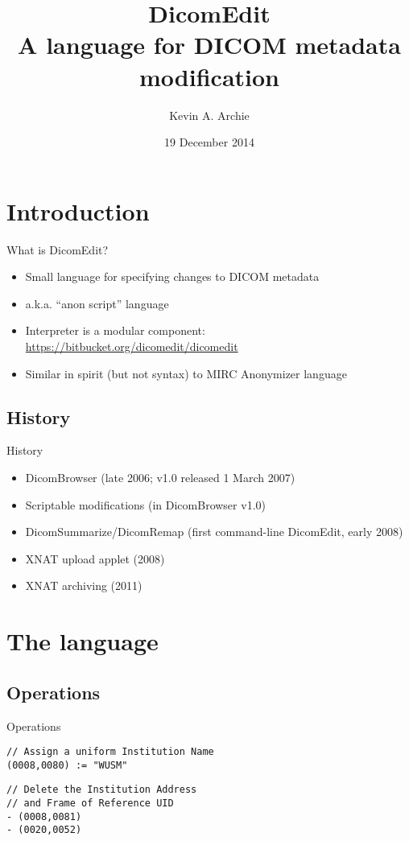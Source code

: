 \documentclass{beamer}  %
\title[DicomEdit]{DicomEdit\\A language for DICOM metadata modification}
\author{Kevin A. Archie}
\institute{Washington University Neuroinformatics Research Group}
\date{19 December 2014}
\begin{document}

\begin{frame}
\titlepage
\end{frame}

\section{Introduction}

\begin{frame}{What is DicomEdit?}
\begin{itemize}
\pause \item Small language for specifying changes to DICOM metadata
\pause \item a.k.a. ``anon script'' language
\pause \item Interpreter is a modular component:
\url{https://bitbucket.org/dicomedit/dicomedit}
\pause \item Similar in spirit (but not syntax) to MIRC Anonymizer language
\end{itemize}
\end{frame}

\subsection{History}
\begin{frame}{History}
\begin{itemize}
\pause \item DicomBrowser (late 2006; v1.0 released 1 March 2007)
\pause \item Scriptable modifications (in DicomBrowser v1.0)
\pause \item DicomSummarize/DicomRemap (first command-line DicomEdit, early 2008)
\pause \item XNAT upload applet (2008)
\pause \item XNAT archiving (2011)
\end{itemize}
\end{frame}

\section{The language}
\subsection{Operations}
\begin{frame}[fragile]{Operations}

\begin{verbatim}
// Assign a uniform Institution Name
(0008,0080) := "WUSM"
\end{verbatim}

\pause
\begin{verbatim}
// Delete the Institution Address
// and Frame of Reference UID
- (0008,0081)
- (0020,0052)
\end{verbatim}

\end{frame}
\end{document}
